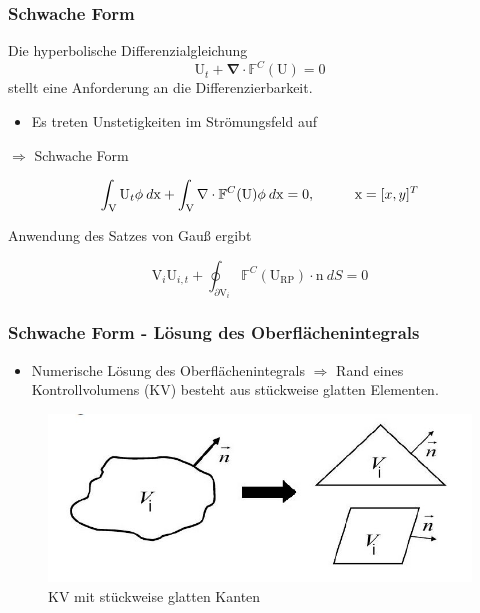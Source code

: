 \documentclass[
	11pt, %
	aspectratio=169, %
]{beamer}
\begin{document}
\begin{frame}

	\frametitle{Schwache Form}

	Die hyperbolische Differenzialgleichung
	\begin{equation}
		\mathrm{U}_t + \mathbf{\nabla} \cdot \mathbb{F}^C (\mathrm{U}) = 0
	\end{equation}
	stellt eine Anforderung an die Differenzierbarkeit. 
	 \begin{itemize}
	 	\item Es treten Unstetigkeiten im Strömungsfeld auf
	 \end{itemize}
	
	\hspace*{1cm}$\Rightarrow$ Schwache Form

	\begin{equation}
		\int_\mathrm{V}{\mathrm{U}_t \phi \: d\mathrm{x}}+\int_{\mathrm{V}}{\nabla \cdot \mathbb{F}^C (\mathrm{U}) \phi \: d\mathrm{x} }=0, \hspace*{1cm} \mathrm{x} = [x,y]^T
	\end{equation}

	Anwendung des Satzes von Gauß ergibt

	\begin{equation}
		\mathrm{V}_i \mathrm{U}_{i,t} + \oint_{\partial \mathrm{V}_i}{\mathbb{F}^C (\mathrm{U_{RP}})\cdot \mathrm{n} \: dS}=0
	\end{equation} 
	

\end{frame}



\begin{frame}
	\frametitle{Schwache Form - Lösung des Oberflächenintegrals}
	\begin{itemize}
		\item Numerische Lösung des Oberflächenintegrals $\Rightarrow$ Rand eines Kontrollvolumens (KV) besteht aus stückweise glatten Elementen.
	\end{itemize}
	\begin{figure}
		\includegraphics[width=0.7\linewidth]{Cells.JPG}
		\caption{KV mit stückweise glatten Kanten}
	\end{figure}
\end{frame}
\end{document}
